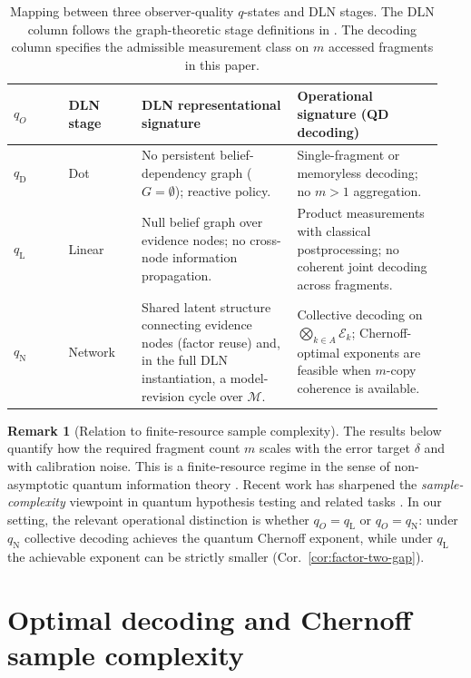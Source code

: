 \documentclass[11pt]{article}
\newcommand{\cE}{\mathcal{E}}
\newcommand{\1}{\mathbf{1}}
\theoremstyle{definition}
\newtheorem{remark}{Remark}
\theoremstyle{plain}
\begin{document}
\begin{table}[t]
\caption{Mapping between three observer-quality $q$-states and DLN stages. The DLN column follows the graph-theoretic stage definitions in \citet{WuDLNCompression2026preprint}. The decoding column specifies the admissible measurement class on $m$ accessed fragments in this paper.}
\label{tab:q-dln-mapping}
\centering
\small
\begin{tabular}{p{0.12\linewidth} p{0.16\linewidth} p{0.34\linewidth} p{0.32\linewidth}}
\toprule
$q_O$ & DLN stage & DLN representational signature & Operational signature (QD decoding) \\
\midrule
$q_{\mathrm{D}}$ & Dot &
No persistent belief-dependency graph ($G=\emptyset$); reactive policy. &
Single-fragment or memoryless decoding; no $m>1$ aggregation. \\
\midrule
$q_{\mathrm{L}}$ & Linear &
Null belief graph over evidence nodes; no cross-node information propagation. &
Product measurements with classical postprocessing; no coherent joint decoding across fragments. \\
\midrule
$q_{\mathrm{N}}$ & Network &
Shared latent structure connecting evidence nodes (factor reuse) and, in the full DLN instantiation, a model-revision cycle over $\mathcal{M}$.
&
Collective decoding on $\bigotimes_{k\in A}\cE_k$; Chernoff-optimal exponents are feasible when $m$-copy coherence is available. \\
\bottomrule
\end{tabular}
\end{table}

\begin{remark}[Relation to finite-resource sample complexity]
The results below quantify how the required fragment count $m$ scales with the error target $\delta$ and with calibration noise.
This is a finite-resource regime in the sense of non-asymptotic quantum information theory \citep{Tomamichel2016,AudenaertMosonyiVerstraete2012}.
Recent work has sharpened the \emph{sample-complexity} viewpoint in quantum hypothesis testing and related tasks \citep{ChengDattaLiuNuradhaSalzmannWilde2025}.
In our setting, the relevant operational distinction is whether $q_O=q_{\mathrm{L}}$ or $q_O=q_{\mathrm{N}}$:
under $q_{\mathrm{N}}$ collective decoding achieves the quantum Chernoff exponent, while under $q_{\mathrm{L}}$ the achievable exponent can be strictly smaller (Cor.~\ref{cor:factor-two-gap}).
\end{remark}

\section{Optimal decoding and Chernoff sample complexity}
\end{document}
